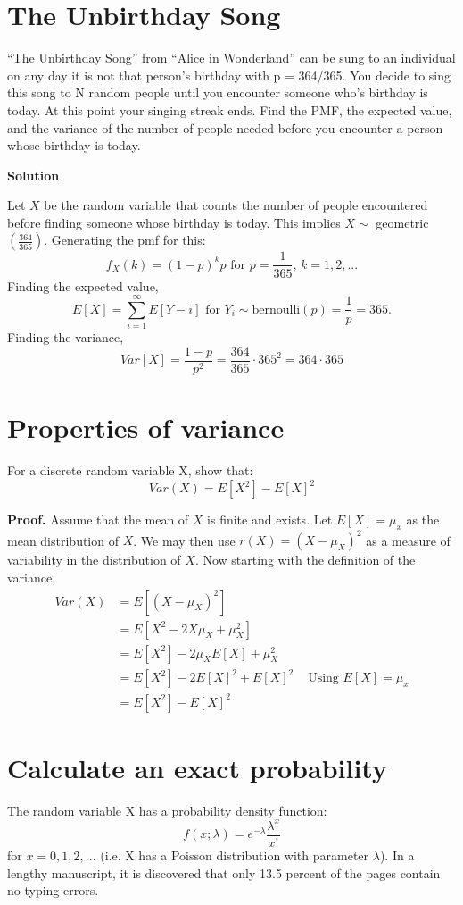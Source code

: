 \documentclass[12pt]{article}
\begin{document}
\section{The Unbirthday Song}
“The Unbirthday Song” from “Alice in Wonderland” can be sung to an individual on any day it is not that person’s birthday with p = 364/365. You decide to sing this song to N random people until you encounter someone who’s birthday is today. At this point your singing streak ends. Find the PMF, the expected value, and the variance of the number of people needed before you encounter a person whose birthday is today.

\textbf{Solution}

Let $X$ be the random variable that counts the number of people encountered before finding someone whose birthday is today. This implies $X \sim $ geometric$(\frac{364}{365})$. Generating the pmf for this:
\[ f_X(k) = (1-p)^kp \text{ for } p=\frac{1}{365}\text{, }k=1,2,...\]
Finding the expected value, 
\[ E[X] = \sum_{i=1}^\infty E[Y-i] \text{ for } Y_i \sim \text{bernoulli}(p) = \frac{1}{p} = 365.\]
Finding the variance, 
\[ Var[X] = \frac{1-p}{p^2} = \frac{364}{365}\cdot 365^2 = 364\cdot365\]

\section{Properties of variance}
For a discrete random variable X, show that:
\[ Var(X) = E[X^2]-E[X]^2\]

\textbf{Proof.} Assume that the mean of $X$ is finite and exists. Let $E[X]=\mu_x$ as the mean distribution of $X$. We may then use $r(X) = (X - \mu_X)^2$ as a measure of variability in the distribution of $X$. Now starting with the definition of the variance, 
\begin{align*}
    Var(X) &= E[(X-\mu_X)^2]
    \\ &= E[X^2 - 2X\mu_X +\mu_X^2]
    \\ &= E[X^2] - 2\mu_X E[X] + \mu_X^2
    \\ &= E[X^2] -2E[X]^2 + E[X]^2      & \text{ Using }E[X]=\mu_x
    \\ &= E[X^2]-E[X]^2
\end{align*}

\section{Calculate an exact probability}
The random variable X has a probability density function:
\[ f(x;\lambda) = e^{-\lambda}\frac{\lambda^x}{x!}\]
for $x=0,1,2,...$ (i.e. X has a Poisson distribution with parameter $\lambda$). In a lengthy manuscript, it is
discovered that only 13.5 percent of the pages contain no typing errors.
\end{document}
